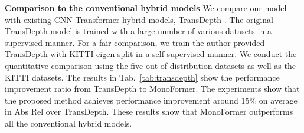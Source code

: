 \documentclass[letterpaper]{article} \usepackage{aaai23}  \usepackage{times}  \usepackage{helvet}  \usepackage{courier}  \usepackage[hyphens]{url}  \usepackage{graphicx} \urlstyle{rm} \def\UrlFont{\rm}  \usepackage{natbib}  \usepackage{caption} \frenchspacing  \setlength{\pdfpagewidth}{8.5in} \setlength{\pdfpageheight}{11in} \usepackage{algorithm}
\newcommand{\tabref}[1]{Tab.~\ref{#1}}
\begin{document}
\begin{table}[!t]
    \centering
    \small
    \caption{\textbf{Ablation study on backbone network.} We use only Transformers (ViT), CNNs (ResNet), and hybrid models (TransDepth \cite{yang2021transformer} and ours). ViT-B and ViT-L are the base and large ViT \cite{dosovitskiy2020image}, respectively. TransDepth and ours use the combination of ResNet50 and ViT-B/16. }
    \vspace{-2mm}
\label{table4_ablation_backbone}
\end{table}


\noindent \textbf{Comparison to the conventional hybrid models} 
We compare our model with existing CNN-Transformer hybrid models, TransDepth \cite{yang2021transformer}. The original TransDepth model is trained with a large number of various datasets in a supervised manner. For a fair comparison, we train the author-provided TransDepth with KITTI eigen split in a self-supervised manner. We conduct the quantitative comparison using the five out-of-distribution datasets as well as the KITTI datasets. The results in \tabref{tab:transdepth} show the performance improvement ratio from TransDepth to MonoFormer. The experiments show that the proposed method achieves performance improvement around 15$\%$ on average in Abs Rel over TransDepth. These results show that MonoFormer outperforms all the conventional hybrid models.
\end{document}
